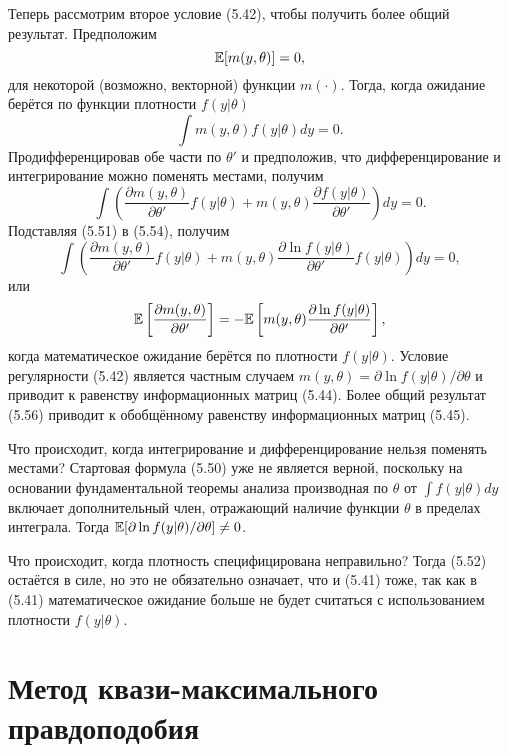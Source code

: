 Теперь рассмотрим второе условие (5.42), чтобы получить более общий результат. Предположим
\[
\mathbb{E}[m(y,\theta)]=0,
\]
для некоторой (возможно, векторной) функции $m(\cdot)$. Тогда, когда ожидание берётся
по функции плотности $f(y|\theta)$
\begin{equation}
\int m(y,\theta)f(y|\theta)dy=0.
\end{equation} 
Продифференцировав обе части по $\theta'$ и предположив, что дифференцирование и интегрирование можно поменять местами, получим
\begin{equation}
\int \left( \frac{\partial m(y,\theta)}{\partial \theta'}f(y|\theta)+m(y,\theta)\frac{\partial f(y|\theta)}{\partial \theta'}\right)dy=0.
\end{equation} 
Подставляя (5.51) в (5.54), получим
\begin{equation}
\int \left(\frac{ \partial m(y,\theta)}{\partial \theta'}f(y|\theta)+m(y,\theta)\frac{\partial \ln  f(y|\theta)}{\partial \theta'}f(y|\theta) \right)dy=0,
\end{equation} 
или
\begin{equation}
\mathbb{E} \left[ \frac{\partial m(y,\theta)}{\partial \theta'} \right] = - \mathbb{E} \left[ m(y,\theta)\frac{\partial \ln  f(y|\theta)}{\partial \theta'} \right],
\end{equation} 
когда математическое ожидание берётся по плотности  $f(y|\theta)$. Условие регулярности (5.42) является частным случаем $m(y,\theta)= \partial \ln f(y|\theta)/\partial \theta$ и приводит к равенству информационных матриц (5.44). Более общий результат (5.56) приводит к обобщённому равенству информационных матриц (5.45).

Что происходит, когда интегрирование и дифференцирование нельзя поменять местами? Стартовая формула (5.50) уже не является верной, поскольку на основании фундаментальной теоремы анализа производная по $\theta$ от $\int f(y|\theta)dy$ включает дополнительный член, отражающий наличие функции $\theta$ в пределах интеграла. Тогда $\mathbb{E}[\partial \ln f(y|\theta)/\partial \theta] \not=0$.

Что происходит, когда плотность специфицирована неправильно? Тогда (5.52) остаётся в силе, но это не обязательно означает, что и (5.41) тоже, так как в (5.41) математическое ожидание больше не будет считаться с использованием плотности $f(y|\theta)$.

\section{Метод квази-максимального правдоподобия}

